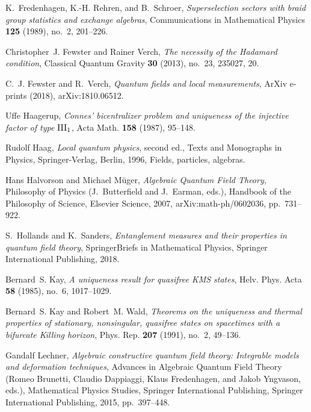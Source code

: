 \documentclass[12pt]{article}
\newcommand{\1}{\mathds{1}}                         %
\begin{document}
{\begin{thebibliography}{BDFY15}
	K.~Fredenhagen, K.-H. Rehren, and B.~Schroer, \emph{Superselection sectors with
		braid group statistics and exchange algebras}, Communications in Mathematical
	Physics \textbf{125} (1989), no.~2, 201--226.
	
	Christopher~J. Fewster and Rainer Verch, \emph{The necessity of the {H}adamard
		condition}, Classical Quantum Gravity \textbf{30} (2013), no.~23, 235027, 20.
	
	C.~J. {Fewster} and R.~{Verch}, \emph{{Quantum fields and local measurements}},
	ArXiv e-prints (2018), arXiv:1810.06512.
	
	Uffe Haagerup, \emph{Connes' bicentralizer problem and uniqueness of the
		injective factor of type {${\rm III}_1$}}, Acta Math. \textbf{158} (1987),
	95--148. 
	
	Rudolf Haag, \emph{Local quantum physics}, second ed., Texts and Monographs in
	Physics, Springer-Verlag, Berlin, 1996, Fields, particles, algebras.
	
	Hans {Halvorson} and Michael {M\"{u}ger}, \emph{{Algebraic Quantum Field
			Theory}}, Philosophy of Physics (J.~Butterfield and J.~Earman, eds.),
	Handbook of the Philosophy of Science, Elsevier Science, 2007,
	arXiv:math-ph/0602036, pp.~731--922.
	
	S.~Hollands and K.~Sanders, \emph{Entanglement measures and their properties in
		quantum field theory}, SpringerBriefs in Mathematical Physics, Springer
	International Publishing, 2018.
	
	Bernard~S. Kay, \emph{A uniqueness result for quasifree {KMS} states}, Helv.
	Phys. Acta \textbf{58} (1985), no.~6, 1017--1029. 
	
	Bernard~S. Kay and Robert~M. Wald, \emph{Theorems on the uniqueness and thermal
		properties of stationary, nonsingular, quasifree states on spacetimes with a
		bifurcate {K}illing horizon}, Phys. Rep. \textbf{207} (1991), no.~2, 49--136.
	
	Gandalf Lechner, \emph{Algebraic constructive quantum field theory: Integrable
		models and deformation techniques}, Advances in Algebraic Quantum Field
	Theory (Romeo Brunetti, Claudio Dappiaggi, Klaus Fredenhagen, and Jakob
	Yngvason, eds.), Mathematical Physics Studies, Springer International
	Publishing, Springer International Publishing, 2015, pp.~397--448.
	

\end{thebibliography}}
\end{document}

